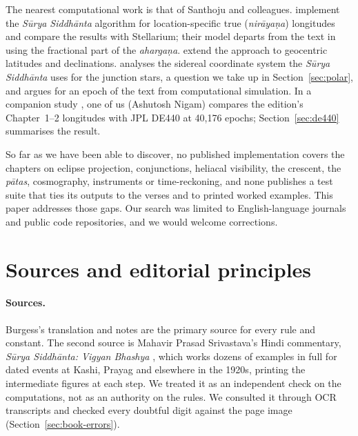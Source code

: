 \documentclass[11pt,a4paper]{article}
\newcommand{\SuSi}{\textit{S\=urya Siddh\=anta}}
\begin{document}
The nearest computational work is that of Santhoju and colleagues. \citet{santhoju2025} implement the \SuSi{} algorithm for location-specific true (\textit{nir\=aya\d{n}a}) longitudes and compare the results with Stellarium; their model departs from the text in using the fractional part of the \textit{aharga\d{n}a}. \citet{santhoju2026} extend the approach to geocentric latitudes and declinations. \citet{roy2019} analyses the sidereal coordinate system the \SuSi{} uses for the junction stars, a question we take up in Section~\ref{sec:polar}, and \citet{narayanan2010} argues for an epoch of the text from computational simulation. In a companion study \citep{nigam2026de440}, one of us (Ashutosh Nigam) compares the edition's Chapter~1--2 longitudes with JPL DE440 \citep{park2021} at 40,176 epochs; Section~\ref{sec:de440} summarises the result.

So far as we have been able to discover, no published implementation covers the chapters on eclipse projection, conjunctions, heliacal visibility, the crescent, the \textit{p\=atas}, cosmography, instruments or time-reckoning, and none publishes a test suite that ties its outputs to the verses and to printed worked examples. This paper addresses those gaps. Our search was limited to English-language journals and public code repositories, and we would welcome corrections.

\section{Sources and editorial principles}
\label{sec:principles}

\paragraph{Sources.} Burgess's translation and notes \citep{burgess1860} are the primary source for every rule and constant. The second source is Mahavir Prasad Srivastava's Hindi commentary, \textit{S\=urya Siddh\=anta: Vigyan Bhashya} \citep{srivastava}, which works dozens of examples in full for dated events at Kashi, Prayag and elsewhere in the 1920s, printing the intermediate figures at each step. We treated it as an independent check on the computations, not as an authority on the rules. We consulted it through OCR transcripts and checked every doubtful digit against the page image (Section~\ref{sec:book-errors}).
\end{document}
